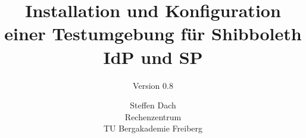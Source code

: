 \documentclass[12pt, a4paper]{scrartcl}
\begin{document}
\title{Installation und Konfiguration einer Testumgebung für Shibboleth IdP und
SP}
\subtitle{Version 0.8}
\author{Steffen Dach\\ Rechenzentrum \\ TU Bergakademie Freiberg}
\maketitle

\newpage
\tableofcontents

\newpage
 



\end{document}
